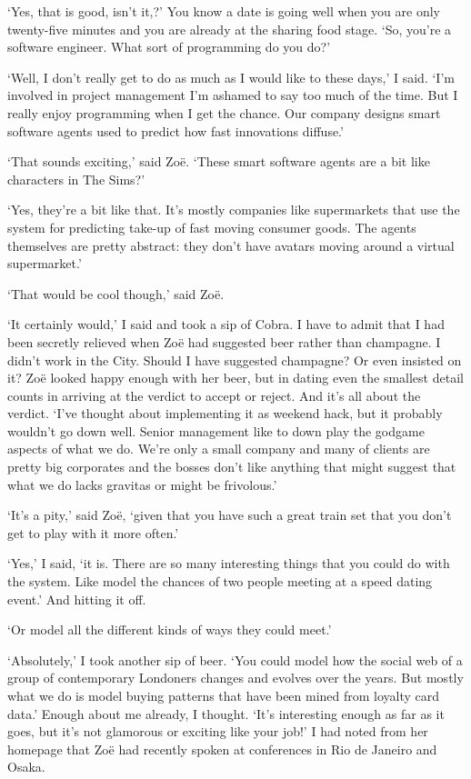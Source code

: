 `Yes, that is good, isn't it,?' You know a date is going well when
you are only twenty-five minutes and you are already at the sharing
food stage. `So, you're a software engineer. What sort of
programming do you do?'

`Well, I don't really get to do as much as I would like to these
days,' I said. `I'm involved in project management I'm ashamed to
say too much of the time. But I really enjoy programming when I get
the chance. Our company designs smart software agents used to
predict how fast innovations diffuse.'

`That sounds exciting,' said Zoë. `These smart software
agents are a bit like characters in {\twelvesl The Sims\/}?'

`Yes, they're a bit like that. It's mostly companies like supermarkets
that use the system for predicting take-up of fast moving consumer
goods. The agents themselves are pretty abstract: they don't have
avatars moving around a virtual supermarket.'

`That would be cool though,' said Zoë.

`It certainly would,' I said and took a sip of Cobra. I have to
admit that I had been secretly relieved when Zoë had suggested
beer rather than champagne. I didn't work in the City. Should I have
suggested champagne? Or even insisted on it? Zoë looked happy
enough with her beer, but in dating even the smallest detail counts
in arriving at the verdict to accept or reject. And it's all about the verdict. `I've thought about
implementing it as weekend hack, but it probably wouldn't go down
well. Senior management like to down play the godgame aspects of
what we do. We're  only a small company and many of clients are
pretty big corporates and the bosses don't like anything that might
suggest that what we do lacks gravitas or might be frivolous.'

`It's a pity,' said Zoë, `given that you have such a great train
set that you don't get to play with it more often.'

`Yes,' I said, `it is. There are so many interesting things that you
could do with the system. Like model the chances of two people
meeting at a speed dating event.' And hitting it off.

`Or model all the different kinds of ways they could meet.'

`Absolutely,' I took another sip of beer. `You could model how the
social web of a group of contemporary Londoners changes and evolves
over the years. But mostly what we do is model buying patterns that
have been mined from loyalty card data.' Enough about me already, I
thought. `It's interesting enough as far as it goes, but it's not
glamorous or exciting like your job!' I had noted from her homepage
that Zoë had recently spoken at conferences in Rio de Janeiro
and Osaka.

